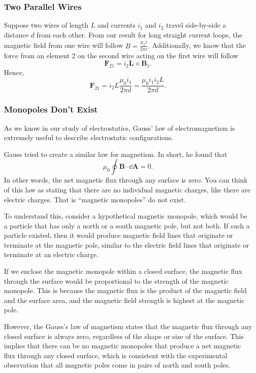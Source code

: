 \documentclass[12pt]{article}
\let\vec\mathbf
\begin{document}
\subsubsection{Two Parallel Wires}
Suppose two wires of length $L$ and  currents $i_1$ and $i_2$ travel side-by-side a distance $d$ from each other. From our result for long straight current loops, the magnetic field from one wire will follow $B = \frac{\mu_0 i}{2\pi r}.$ Additionally, we know that the force from an element 2 on the second wire acting on the first wire will follow 
\[\vec F_{21} = i_2 \vec L \times \vec B_1.\]
Hence,
\[\vec F_{21} = i_2 L \frac{\mu_0 i_1}{2\pi d} = \frac{\mu_0 i_1 i_2 L}{2\pi d}.\]
\subsubsection{Monopoles Don't Exist}
As we know in our study of electrostatics, Gauss' law of electromagnetism is extremely useful to describe electrostatic configurations. 
\begin{idea}
Gauss tried to create a similar law for magnetism. In short, he found that 
\[\mu_0 \oint \vec B \cdot \dd \vec A = 0.\]
In other words, the net magnetic flux through any surface is zero. You can think of this law as stating that there are no individual magnetic charges, like there are electric charges. That is “magnetic monopoles” do not exist.
\end{idea}
To understand this, consider a hypothetical magnetic monopole, which would be a particle that has only a north or a south magnetic pole, but not both. If such a particle existed, then it would produce magnetic field lines that originate or terminate at the magnetic pole, similar to the electric field lines that originate or terminate at an electric charge.

If we enclose the magnetic monopole within a closed surface, the magnetic flux through the surface would be proportional to the strength of the magnetic monopole. This is because the magnetic flux is the product of the magnetic field and the surface area, and the magnetic field strength is highest at the magnetic pole.

However, the Gauss's law of magnetism states that the magnetic flux through any closed surface is always zero, regardless of the shape or size of the surface. This implies that there can be no magnetic monopoles that produce a net magnetic flux through any closed surface, which is consistent with the experimental observation that all magnetic poles come in pairs of north and south poles.
\end{document}

